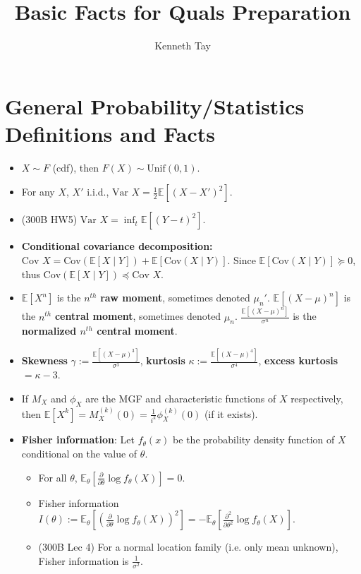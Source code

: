 \documentclass[twoside]{article}
\newcommand{\dis}{\displaystyle}
\newcommand\bbE{\mathbb{E}}
\newcommand\sg{\sigma}
\def\t{\theta}
\newcommand\var{\text{Var }}
\begin{document}
\title{Basic Facts for Quals Preparation}
\author{Kenneth Tay}
\date{\vspace{-3ex}}
\maketitle

\tableofcontents

\section{General Probability/Statistics Definitions and Facts}
\begin{itemize}
\item $X \sim F$ (cdf), then $F(X) \sim \text{Unif}(0,1)$.

\item For any $X$, $X'$ i.i.d., $\var X = \dis\frac{1}{2}\bbE[(X- X')^2]$.

\item (300B HW5) $\var X = \inf_t \bbE [(Y - t)^2]$.

\item \textbf{Conditional covariance decomposition:} $\text{Cov } X = \text{Cov} (\bbE [X \mid Y]) + \bbE[\text{Cov} (X \mid Y)]$. Since $\bbE[\text{Cov} (X \mid Y)] \succeq 0$, thus $\text{Cov} (\bbE [X \mid Y]) \preceq \text{Cov } X$.

\item $\bbE [X^n]$ is the $n^{th}$ \textbf{raw moment}, sometimes denoted $\mu_n'$. $\bbE [(X-\mu)^n]$ is the $n^{th}$ \textbf{central moment}, sometimes denoted $\mu_n$. $\displaystyle\frac{\bbE [(X-\mu)^n]}{\sg^n}$ is the \textbf{normalized $n^{th}$ central moment}.

\item \textbf{Skewness} $\gamma := \displaystyle\frac{\bbE [(X-\mu)^3]}{\sg^3}$, \textbf{kurtosis} $\kappa := \displaystyle\frac{\bbE [(X-\mu)^4]}{\sg^4}$, \textbf{excess kurtosis} $= \kappa - 3$.

\item If $M_X$ and $\phi_X$ are the MGF and characteristic functions of $X$ respectively, then $\bbE [X^k] = M_X^{(k)}(0) = \displaystyle\frac{1}{i^k} \phi_X^{(k)}(0)$ (if it exists).

\item \textbf{Fisher information}: Let $f_\t(x)$ be the probability density function of $X$ conditional on the value of $\t$.
\begin{itemize}
\item For all $\t$, $\bbE_\t \left[ \displaystyle\frac{\partial}{\partial \t} \log f_\t (X) \right] = 0$.
\item Fisher information $I(\t) := \bbE_\t \left[ \left(\displaystyle\frac{\partial}{\partial \t} \log f_\t (X)\right)^2 \right] = - \bbE_\t \left[ \displaystyle\frac{\partial^2}{\partial \t^2} \log f_\t (X) \right]$.
\item (300B Lec 4) For a normal location family (i.e. only mean unknown), Fisher information is $\dis\frac{1}{\sg^2}$.


\end{itemize}
\end{itemize}
\end{document}
